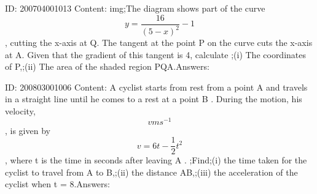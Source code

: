 \documentclass{article}
\begin{document}
ID: 200704001013
Content:
img;The diagram shows part of the curve $$y=\frac{16}{(5-x)^2 }-1$$, cutting the x-axis at Q. The tangent at the point P on the curve cuts the x-axis at A. Given that the gradient of this tangent is 4, calculate ;(i) The coordinates of P,;(ii) The area of the shaded region PQA.Answers:

ID: 200803001006
Content:
A cyclist starts from rest from a point A and travels in a straight line until he comes to a rest at a point B . During the motion, his velocity, $$v ms^{-1}$$, is given by $$v = 6t-\frac{1}{2}t^2$$, where t is the time in seconds after leaving A . ;Find;(i) the time taken for the cyclist to travel from A to B,;(ii) the distance AB,;(iii) the acceleration of the cyclist when t = 8.Answers:
\end{document}
